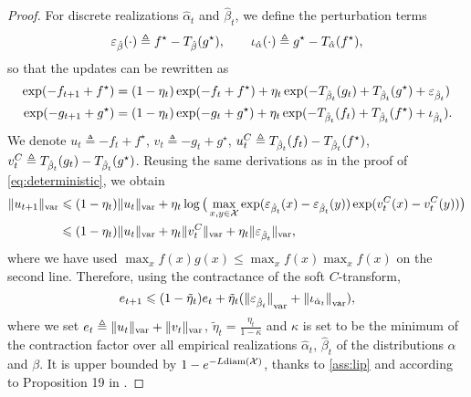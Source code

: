 \begin{proof}
For discrete realizations $\hat \alpha_t$ and $\hat \beta_t$, we define the perturbation terms 
\begin{equation}
    \epsilon_{\hat \beta}(\cdot) \triangleq
    f^\star - \Ctrans{g^\star}{\hat \beta} ,\qquad
    \iota_{\hat \alpha}(\cdot) \triangleq 
    g^\star - \Ctrans{f^\star}{\hat \alpha},
\end{equation}
so that the updates can be rewritten as
\begin{align}
    \exp(-f_{t+1} + f^\star) &= (1 - \eta_t)
    \exp(-f_{t} + f^\star)
    + \eta_t \exp(-\Ctrans{g_t}{\hat \beta_t} 
    +\Ctrans{g^\star}{\hat \beta_t} + \epsilon_{\hat \beta_t}) \\
    \exp(-g_{t+1} + g^\star) &= (1 - \eta_t)
    \exp(-g_{t} + g^\star)
    + \eta_t \exp(-\Ctrans{f_t}{\hat \beta_t} 
    +\Ctrans{f^\star}{\hat \beta_t} + \iota_{\hat \beta_t}).
\end{align}
We denote $u_t \triangleq -f_{t} + f^\star$, $v_t \triangleq -g_{t} + g^\star$, $u_t^C \triangleq
\Ctrans{f_t}{\hat \beta_t} - \Ctrans{f^\star}{\hat \beta_t}$, $v_t^C \triangleq
\Ctrans{g_t}{\hat \beta_t} - \Ctrans{g^\star}{\hat \beta_t}$. Reusing the same
derivations as in the proof of \autoref{eq:deterministic}, we obtain
    \label{eq:pre_ineq_var}
    \begin{align}
    \Vert u_{t+1} \Vert_{\var} &\leq
    (1 - \eta_t) \Vert u_t \Vert_{\var}
    + \eta_t \log \big( \max_{x, y \in \Xx}
    \exp(\epsilon_{\hat \beta_t}(x) 
    - \epsilon_{\hat \beta_t}(y)) \exp(v_t^C(x) - v_t^C(y)) \big) \\ 
    &\leq
    (1 - \eta_t) \Vert u_t \Vert_{\var}
    + \eta_t \Vert v_t^C \Vert_{\var}
    + \eta_t \Vert \epsilon_{\hat \beta_t} \Vert_{\var},
\end{align}
where we have used $\max_x f(x) g(x) \leq \max_x f(x) \max_x f(x)$ on the second line. Therefore,
using the contractance of the soft $C$-transform,
\begin{equation}
    \label{eq:ineq_var}
    e_{t+1} \leq 
    (1 - \tilde \eta_t) e_t
    + \tilde \eta_t
    ({\Vert \epsilon_{\hat \beta_t} \Vert}_{\var} + 
    {\Vert \iota_{\hat \alpha_t} \Vert}_{\var}),
\end{equation}
where we set $e_t \triangleq \Vert u_t \Vert_{\var} + \Vert v_t \Vert_{\var}$,
$\tilde \eta_t = \frac{\eta_t}{1-\kappa}$ and $\kappa$ is set to be the minimum
of the contraction factor over all empirical realizations $\hat \alpha_t$, $\hat
\beta_t$ of the distributions $\alpha$ and $\beta$. It is upper bounded by
$1 - e^{- L\text{diam}(\Xx)}$, thanks to \autoref{ass:lip} and according to Proposition 19 in \citet{vialard2019elementary}.


\end{proof}
